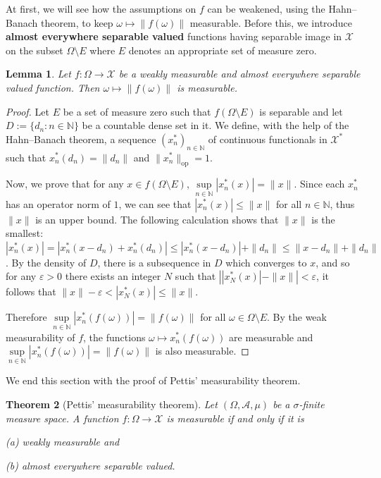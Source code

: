 \documentclass[a4paper, 12pt]{article}
\newtheorem{lem}{Lemma}[section]
\newtheorem{theo}[lem]{Theorem}
\begin{document}
At first, we will see how the assumptions on $f$ can be weakened, using the Hahn\---Banach theorem, to keep $\omega \mapsto \| f(\omega) \|$ measurable. Before this, we introduce \textbf{almost everywhere separable valued} functions having separable image in $\mathcal{X}$ on the subset $\Omega \setminus E$ where $E$ denotes an appropriate set of measure zero.
\begin{lem}\label{all:gyengen-merheto-szaparalhato-lemma} Let $f \colon \Omega \rightarrow \mathcal{X}$ be a weakly measurable and almost everywhere separable valued function. Then $\omega \mapsto \| f(\omega) \|$ is measurable.
\end{lem}
\begin{proof} Let $E$ be a set of measure zero such that $f(\Omega \setminus E)$ is separable and let $D:=\lbrace d_n : n \in \mathbb{N} \rbrace$ be a countable dense set in it. We define, with the help of the Hahn\---Banach theorem, a sequence $(x^*_n)_{n \in \mathbb{N}}$ of continuous functionals in $\mathcal{X}^*$ such that $x^*_n(d_n) = \| d_n \|$ and $\| x^*_n \|_{\mathrm{op}} = 1$.

Now, we prove that for any $x \in f(\Omega \setminus E)$, $\sup\limits_{n \in \mathbb{N}} |x^*_n(x)| = \| x \|$. Since each $x^*_n$ has an operator norm of $1$, we can see that $|x^*_n(x)| \leqslant \| x \|$ for all $n \in \mathbb{N}$, thus $\| x\|$ is an upper bound. The following calculation shows that $\| x \|$ is the smallest: $| x^*_n(x) | = |x^*_n(x-d_n) + x^*_n(d_n)| \leqslant |x^*_n(x-d_n)| + \| d_n \| \leqslant \| x-d_n \| + \|d_n \|$. By the density of $D$, there is a subsequence in $D$ which converges to $x$, and so for any $\varepsilon > 0$ there exists an integer $N$ such that $\left | | x^*_N(x)| - \| x \| \right| < \varepsilon$, it follows that $\| x \| - \varepsilon < |x^*_N(x)| \leqslant \| x \|$.

Therefore $\sup\limits_{n \in \mathbb{N}} |x^*_n(f(\omega))| = \| f(\omega) \|$ for all $\omega \in \Omega \setminus E$. By the weak measurability of $f$, the functions $\omega \mapsto x^*_n(f(\omega))$ are measurable and $\sup\limits_{n \in \mathbb{N}}|x^*_n(f(\omega))| = \|  f(\omega) \|$ is also measurable.
\end{proof}
We end this section with the proof of Pettis' measurability theorem.
\begin{theo}[Pettis' measurability theorem]\label{all:pettis-m-theorem} Let $(\Omega, \mathcal{A}, \mu)$ be a $\sigma$-finite measure space.
A function $f \colon \Omega \rightarrow \mathcal{X}$ is measurable if and only if it is

(a) weakly measurable and

(b) almost everywhere separable valued.
\end{theo}
\end{document}

